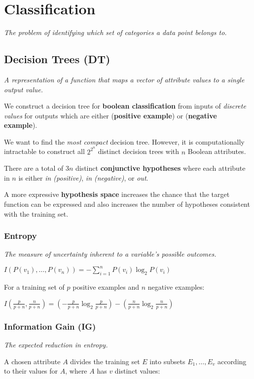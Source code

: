 \section{Classification}
\emph{The problem of identifying which set of categories a data point belongs to.}
\subsection{Decision Trees (DT)}
\emph{A representation of a function that maps a vector of attribute values to a single output value.}

We construct a decision tree for \textbf{boolean classification} from inputs of \emph{discrete values}
for outputs which are either  (\textbf{positive example}) or  (\textbf{negative example}).

We want to find the \emph{most compact} decision tree.
However, it is computationally intractable to construct all $2^{2^n}$ distinct decision trees
with $n$ Boolean attributes.

There are a total of $3n$ distinct \textbf{conjunctive hypotheses} where each attribute in $n$
is either \emph{in (positive)}, \emph{in (negative)}, or \emph{out}.

A more expressive \textbf{hypothesis space} increases the chance that the target function can be expressed
and also increases the number of hypotheses consistent with the training set.

\subsubsection{Entropy}
\emph{The measure of uncertainty inherent to a variable's possible outcomes.}

$I(P(v_1), \dots, P(v_n)) = -\sum_{i=1}^{n} P(v_i) \log_{2}P(v_i)$

For a training set of $p$ positive examples and $n$ negative examples:

$I\left( \frac{p}{p+n}, \frac{n}{p+n} \right) =
\left( -\frac{p}{p+n} \log_{2}\frac{p}{p+n} \right) - 
\left( \frac{n}{p+n} \log_{2}\frac{n}{p+n} \right)$

\subsubsection{Information Gain (IG)}
\emph{The expected reduction in entropy.}

A chosen attribute $A$ divides the training set $E$ into subsets $E_1, \dots, E_v$ according to
their values for $A$, where $A$ has $v$ distinct values:

